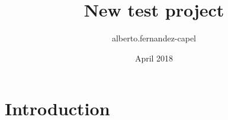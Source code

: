 \documentclass{article}
\title{New test project}
\author{alberto.fernandez-capel }
\date{April 2018}
\begin{document}
\maketitle

\section{Introduction}
\end{document}
